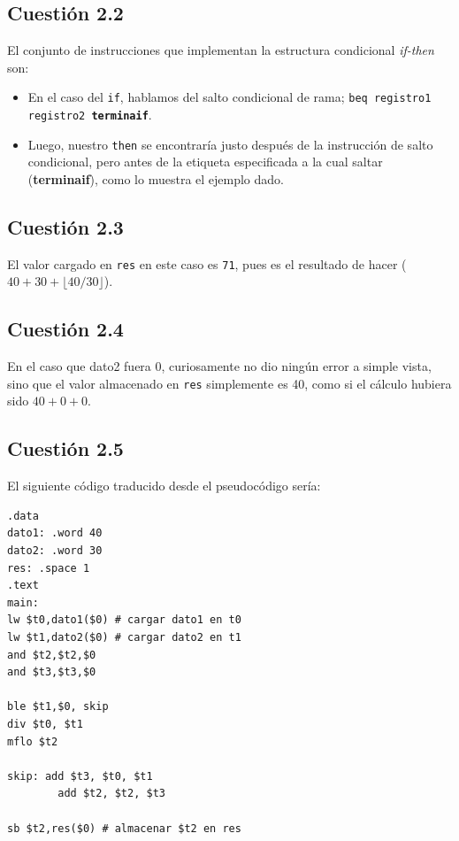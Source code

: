 \documentclass[11pt]{article}
\begin{document}
\begin{large}
\begin{flushleft}
\subsection*{Cuestión 2.2}
El conjunto de instrucciones que implementan la estructura condicional \textit{if-then} son:

\begin{itemize}
    \item En el caso del \texttt{if}, hablamos del salto condicional de rama; \texttt{beq registro1 registro2 \textbf{terminaif}}.
    \item Luego, nuestro \texttt{then} se encontraría justo después de la instrucción de salto condicional, pero antes de la etiqueta especificada a la cual saltar (\textbf{terminaif}), como lo muestra el ejemplo dado.
\end{itemize}


\subsection*{Cuestión 2.3}
El valor cargado en \texttt{res} en este caso es \texttt{71}, pues es el resultado de hacer (\texttt{$40+30+\lfloor40/30\rfloor$}).


\subsection*{Cuestión 2.4}
En el caso que dato2 fuera 0, curiosamente no dio ningún error a simple vista, sino que el valor almacenado en \texttt{res} simplemente es 40, como si el cálculo hubiera sido \texttt{$40+0+0$}.


\subsection*{Cuestión 2.5}
El siguiente código traducido desde el pseudocódigo sería:
\begin{listing}[h]
\begin{verbatim}
.data
dato1: .word 40
dato2: .word 30
res: .space 1
.text
main: 
lw $t0,dato1($0) # cargar dato1 en t0
lw $t1,dato2($0) # cargar dato2 en t1
and $t2,$t2,$0
and $t3,$t3,$0

ble $t1,$0, skip
div $t0, $t1
mflo $t2

skip: add $t3, $t0, $t1
        add $t2, $t2, $t3

sb $t2,res($0) # almacenar $t2 en res

\end{verbatim}
\end{listing}



\end{flushleft}
\end{large}
\end{document}
